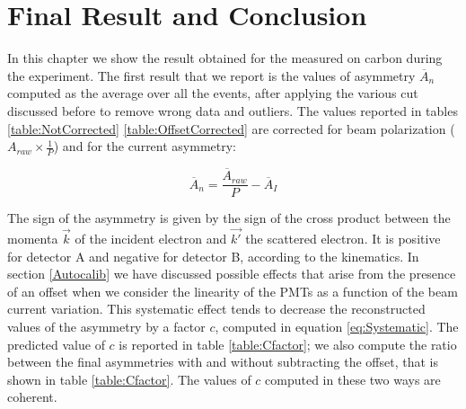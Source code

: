 \chapter{Final Result and Conclusion} \label{result}

In this chapter we show the result obtained for the \transv measured on carbon during the experiment.
The first result that we report is the values of asymmetry $\overline{A}_{n}$ computed as the average over all the events, after applying the various cut discussed before to remove wrong data and outliers. The values reported in tables \ref{table:NotCorrected} \ref{table:OffsetCorrected} are corrected for beam polarization ($A_{raw} \times \frac{1}{P}$) and for the current asymmetry:

\begin{equation}
\overline{A}_{n} = \frac{\overline{A}_{raw}}{P} - \overline{A}_{I}
\end{equation}

The sign of the asymmetry is given by the sign of the cross product between the momenta $\vec{k}$ of the incident electron and $\vec{k'}$ the scattered electron. It is positive for detector A and negative for detector B, according to the kinematics.
In section \ref{Autocalib} we have discussed possible effects that arise from the presence of an offset when we consider the linearity of the PMTs as a function of the beam current variation. This systematic effect tends to decrease the reconstructed values of the asymmetry by a factor $c$, computed in equation \ref{eq:Systematic}. The predicted value of $c$ is reported in table \ref{table:Cfactor}; we also compute the ratio between the final asymmetries with and without subtracting the offset, that is shown in table \ref{table:Cfactor}. The values of $c$ computed in these two ways are coherent.

